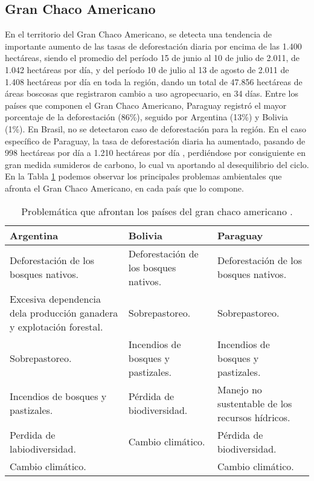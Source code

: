 \subsection{Gran Chaco Americano}
En el territorio del Gran Chaco Americano, se detecta una tendencia de importante aumento de las tasas de deforestaci\'on diaria por encima de las 1.400 hect\'areas, siendo el promedio del per\'iodo 15 de junio al 10 de julio de 2.011, de 1.042 hect\'areas por d\'ia, y del per\'iodo 10 de julio al 13 de agosto de 2.011 de 1.408 hect\'areas por d\'ia en toda la regi\'on, dando un total de 47.856 hect\'areas de \'areas boscosas que registraron cambio a uso agropecuario, en 34 d\'ias. Entre los pa\'ises que componen el Gran Chaco Americano,  Paraguay  registr\'o el mayor porcentaje de la deforestaci\'on (86\%), seguido por Argentina (13\%) y Bolivia (1\%). En Brasil, no se detectaron caso de deforestaci\'on para la regi\'on. En el caso espec\'ifico de Paraguay, la tasa de deforestaci\'on diaria ha aumentado, pasando de 998 hect\'areas por d\'ia a 1.210 hect\'areas por d\'ia \cite{fao2003revista}, perdi\'endose por consiguiente en gran medida sumideros de carbono, lo cual va aportando al desequilibrio del ciclo. En la Tabla \ref{tab:chacoamericano} podemos observar los principales problemas ambientales que afronta el Gran Chaco Americano, en cada pa\'is que lo compone.
\begin{table}[!hbtp]
	\centering
	\caption{Problem\'atica que afrontan los países del gran chaco americano \cite{gustavo2012deteccion}.}
	\label{tab:chacoamericano}
	\begin{tabular}{|p{4cm}|p{4cm}|p{4cm}|}
		\hline
		{\bf Argentina} & {\bf Bolivia} & {\bf Paraguay} \\ \hline
		Deforestaci\'on de los bosques nativos. & Deforestaci\'on de los bosques nativos. & Deforestaci\'on de los bosques nativos. \\ \hline
		Excesiva dependencia dela producci\'on ganadera y explotaci\'on forestal. & Sobrepastoreo. & Sobrepastoreo. \\ \hline
		Sobrepastoreo. & Incendios de bosques y pastizales. & Incendios de bosques y pastizales. \\ \hline
		Incendios de bosques y pastizales. & P\'erdida de biodiversidad. & Manejo no sustentable de los recursos h\'idricos. \\ \hline
		Perdida de labiodiversidad. & Cambio clim\'atico. & P\'erdida de biodiversidad. \\ \hline
		Cambio clim\'atico. &  & Cambio clim\'atico. \\ \hline
	\end{tabular}
\end{table}


